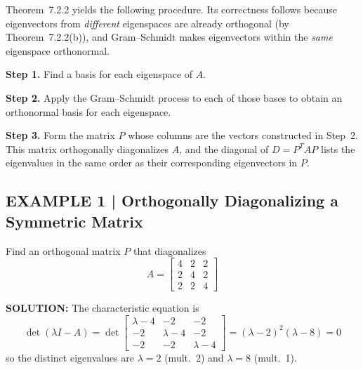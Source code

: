 \documentclass{article}
\theoremstyle{mystyle}
\begin{document}
Theorem~7.2.2 yields the following procedure. Its correctness follows because eigenvectors
from \emph{different} eigenspaces are already orthogonal (by Theorem~7.2.2(b)), and
Gram--Schmidt makes eigenvectors within the \emph{same} eigenspace orthonormal.

\begin{tcolorbox}[colback=teal!4, colframe=teal!65!black,
  title={Orthogonally Diagonalizing an $n\times n$ Symmetric Matrix},
  fonttitle=\bfseries, boxrule=0.5mm, arc=3mm]
\textbf{\color{teal!70!black}Step 1.} Find a basis for each eigenspace of $A$.

\textbf{\color{teal!70!black}Step 2.} Apply the Gram--Schmidt process to each of those
bases to obtain an orthonormal basis for each eigenspace.

\textbf{\color{teal!70!black}Step 3.} Form the matrix $P$ whose columns are the vectors
constructed in Step~2. This matrix orthogonally diagonalizes $A$, and the diagonal of
$D = P^T AP$ lists the eigenvalues in the same order as their corresponding eigenvectors
in $P$.
\end{tcolorbox}

\subsection*{EXAMPLE 1 | Orthogonally Diagonalizing a Symmetric Matrix}

Find an orthogonal matrix $P$ that diagonalizes
\[
  A = \begin{bmatrix}4&2&2\\2&4&2\\2&2&4\end{bmatrix}
\]

\textbf{SOLUTION:} The characteristic equation is
\[
  \det(\lambda I - A) = \det\begin{bmatrix}\lambda-4&-2&-2\\-2&\lambda-4&-2\\-2&-2&\lambda-4\end{bmatrix}
  = (\lambda-2)^2(\lambda-8) = 0
\]
so the distinct eigenvalues are $\lambda=2$ (mult.~2) and $\lambda=8$ (mult.~1).
\end{document}
